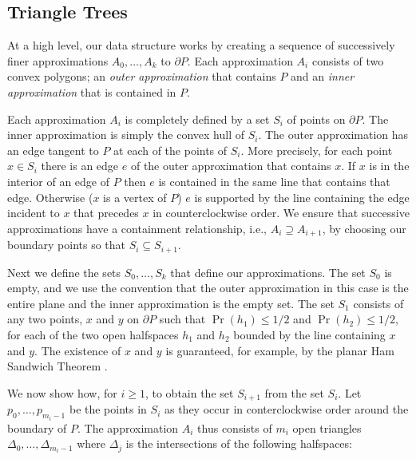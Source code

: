 \documentclass[charterfonts,lotsofwhite]{patmorin}
\newcommand{\boundary}{\partial}
\begin{document}
\subsection{Triangle Trees}

At a high level, our data structure works by creating a sequence of
successively finer approximations $A_0,\ldots,A_k$ to $\boundary P$.
Each approximation $A_i$ consists of two convex polygons; an
\emph{outer approximation} that contains $P$ and an \emph{inner
approximation} that is contained in $P$.

Each approximation $A_i$ is completely defined by a set $S_i$ of
points on $\boundary P$.  The inner approximation is simply the convex
hull of $S_i$.  The outer approximation has an edge tangent to $P$ at
each of the points of $S_i$.  More precisely, for each point $x\in
S_i$ there is an edge $e$ of the outer approximation that contains
$x$.  If $x$ is in the interior of an edge of $P$ then $e$ is
contained in the same line that contains that edge. Otherwise ($x$ is
a vertex of $P$) $e$ is supported by the line containing the edge
incident to $x$ that precedes $x$ in counterclockwise order.  We
ensure that successive approximations have a containment relationship,
i.e., $A_i\supseteq A_{i+1}$, by choosing our boundary points so that
$S_i\subseteq S_{i+1}$.

Next we define the sets $S_0,\ldots,S_k$ that define our
approximations.  The set $S_0$ is empty, and we use the convention
that the outer approximation in this case is the entire plane and the
inner approximation is the empty set. The set $S_1$ consists of any
two points, $x$ and $y$ on $\boundary P$ such that $\Pr(h_1)\le 1/2$
and $\Pr(h_2)\le 1/2$, for each of the two open halfspaces $h_1$ and
$h_2$ bounded by the line containing $x$ and $y$. The existence of $x$
and $y$ is guaranteed, for example, by the planar Ham Sandwich Theorem
\cite{bz04}.

We now show how, for $i\ge 1$, to obtain the set $S_{i+1}$ from the
set $S_{i}$.  Let $p_0,\ldots,p_{m_i-1}$ be the points in $S_i$ as
they occur in conterclockwise order around the boundary of $P$.  The
approximation $A_i$ thus consists of $m_i$ open triangles
$\Delta_0,\ldots,\Delta_{m_i-1}$ where $\Delta_j$ is the intersections
of the following halfspaces:
\end{document}
